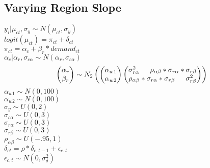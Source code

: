 \documentclass[12pt]{article}
\begin{document}
\subsection{Varying Region Slope}
 $ y_i|\mu_{ct},\sigma_y \sim N(\mu_{ct}, \sigma_y) $ \\
 $ logit(\mu_{ct})=  \pi_{ct} + \delta_{ct} $\\
 $ \pi_{ct} = \alpha_c + \beta_r*demand_{ct} $ \\
 $ \alpha_c|\alpha_r,\sigma_{c\alpha} \sim N(\alpha_r,\sigma_{c\alpha}) $ \\
\begin{equation*}
  \begin{pmatrix}
  	\alpha_r \\
  	\beta_r 
  \end{pmatrix}
  \sim N_2
  \begin{pmatrix}
  	\begin{pmatrix}
    	\alpha_{w1} \\
    	\alpha_{w2}
  	\end{pmatrix}
  	\begin{pmatrix}
    	\sigma^2_{r\alpha}  $\indent$  \rho_{\alpha\beta}*\sigma_{r\alpha}*\sigma_{r\beta} \\
    	\rho_{\alpha\beta}*\sigma_{r\alpha}*\sigma_{r\beta} $\indent$ \sigma^2_{r\beta}
  	\end{pmatrix} 
  \end{pmatrix} \\
\end{equation*}
 $ \alpha_{w1} \sim N(0,100) $ \\
 $ \alpha_{w2} \sim N(0,100) $ \\

\noindent
 $ \sigma_y \sim U(0,2) $ \\
 $\sigma_{c\alpha} \sim U(0,3) $ \\
 $\sigma_{r\alpha} \sim U(0,3) $ \\
 $\sigma_{r\beta} \sim U(0,3) $\\
 $\rho_{\alpha\beta} \sim U(-.95,1)$ \\

\noindent
 $ \delta_{ct} = \rho*\delta_{c,t-1}+\epsilon_{c,t} $ \\
 $ \epsilon_{c,t} \sim N(0,\sigma^2_\delta) $ \\ 
\newpage
\end{document}
